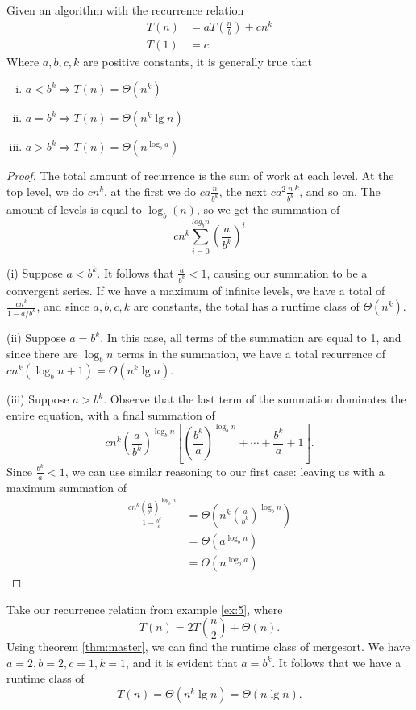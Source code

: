 \documentclass{article}
\begin{document}
 \begin{theorem}\label{thm:master}
  Given an algorithm with the recurrence relation
  \begin{align*}
   T(n) &= aT\left(\frac{n}{b}\right) + cn^k \\
   T(1) &= c
  \end{align*}
  Where $a,b,c,k$ are positive constants, it is generally true that
  \begin{enumerate}[i.]
   \item $a < b^k \Longrightarrow T(n) = \Theta(n^k)$
   \item $a = b^k \Longrightarrow T(n) = \Theta(n^k\lg n)$
   \item $a > b^k \Longrightarrow T(n) = \Theta(n^{\log_ba})$
  \end{enumerate}
 \end{theorem}
 \begin{proof}
  The total amount of recurrence is the sum of work at each level. At the top level, we do $cn^k$, at the first we do $ca\frac{n}{b^k}$, the next $ca^2\frac{n}{b^k}^k$, and so on. The amount of levels is equal to $\log_b(n)$, so we get the summation of
  $$ cn^k\sum_{i=0}^{log_bn} \left(\frac{a}{b^k}\right)^i $$

  (i) Suppose $a < b^k$. It follows that $\frac{a}{b^k} < 1$, causing our summation to be a convergent series. If we have a maximum of infinite levels, we have a total of $\frac{cn^k}{1 - a/b^k}$, and since $a,b,c,k$ are constants, the total has a runtime class of $\Theta(n^k)$.

  (ii) Suppose $a = b^k$. In this case, all terms of the summation are equal to 1, and since there are $\log_bn$ terms in the summation, we have a total recurrence of $cn^k(\log_bn + 1) = \Theta(n^k\lg n)$.

  (iii) Suppose $a > b^k$. Observe that the last term of the summation dominates the entire equation, with a final summation of
  $$ cn^k\left(\frac{a}{b^k}\right)^{\log_bn} \left[\left(\frac{b^k}{a}\right)^{\log_bn} + \cdots + \frac{b^k}{a} + 1 \right]. $$
  Since $\frac{b^k}{a} < 1$, we can use similar reasoning to our first case: leaving us with a maximum summation of
  \begin{align*}
   \frac{cn^k\left(\frac{a}{b^k}\right)^{\log_bn}}{1-\frac{b^k}{a}} &= \Theta\left(n^k\left(\frac{a}{b^k}\right)^{\log_bn}\right) \\
   &= \Theta\left(a^{\log_bn}\right) \\
   &= \Theta\left(n^{\log_ba}\right).
  \end{align*}
 \end{proof}

 \begin{example}\label{ex:6}
  Take our recurrence relation from example \ref{ex:5}, where
  $$ T(n) = 2T\left(\frac{n}{2}\right) + \Theta(n). $$
  Using theorem \ref{thm:master}, we can find the runtime class of mergesort. We have $a=2,b=2,c=1,k=1$, and it is evident that $a=b^k$. It follows that we have a runtime class of
  $$ T(n) = \Theta(n^k\lg n) = \Theta(n\lg n). $$
 \end{example}



 
\end{document}

